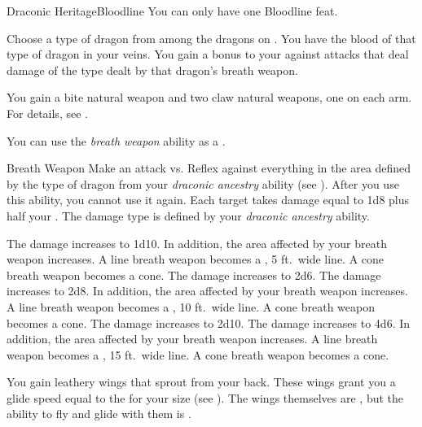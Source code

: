     \begin{feat}{Draconic Heritage}{Bloodline}
         You can only have one Bloodline feat.

         Choose a type of dragon from among the dragons on .
        You have the blood of that type of dragon in your veins.
        You gain a  bonus to your  against attacks that deal damage of the type dealt by that dragon's breath weapon.

         You gain a bite natural weapon and two claw natural weapons, one on each arm.
        For details, see .

         You can use the \textit{breath weapon} ability as a .
        \begin{freeability}{Breath Weapon}
            Make an attack vs. Reflex against everything in the area defined by the type of dragon from your \textit{draconic ancestry} ability (see ).
            After you use this ability, you  cannot use it again.
            \hit Each target takes damage equal to 1d8 plus half your .
            The damage type is defined by your \textit{draconic ancestry} ability.

            \rankline
             The damage increases to 1d10.
                In addition, the area affected by your breath weapon increases.
                A line breath weapon becomes a \arealarge, 5 ft.\ wide line.
                A cone breath weapon becomes a \areamed cone.
             The damage increases to 2d6.
             The damage increases to 2d8.
                In addition, the area affected by your breath weapon increases.
                A line breath weapon becomes a \areahuge, 10 ft.\ wide line.
                A cone breath weapon becomes a \arealarge cone.
             The damage increases to 2d10.
             The damage increases to 4d6.
                In addition, the area affected by your breath weapon increases.
                A line breath weapon becomes a \areagarg, 15 ft.\ wide line.
                A cone breath weapon becomes a \areahuge cone.
        \end{freeability}

         You gain leathery wings that sprout from your back.
        These wings grant you a glide speed equal to the  for your size (see ).
        The wings themselves are , but the ability to fly and glide with them is .


\end{feat}
